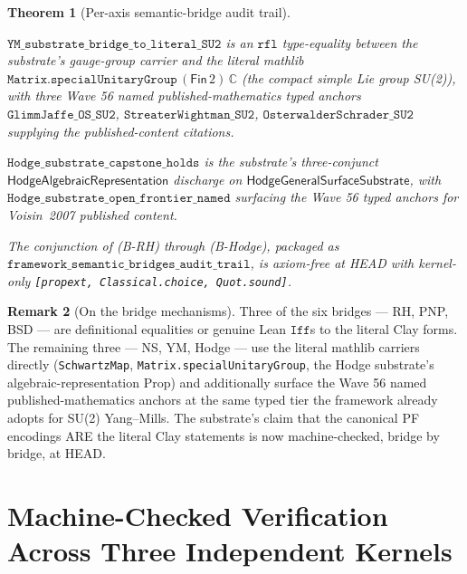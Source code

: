 \documentclass[11pt,a4paper]{amsart}
\theoremstyle{plain}
\newtheorem{theorem}{Theorem}[section]
\theoremstyle{definition}
\newtheorem{remark}[theorem]{Remark}
\begin{document}
\begin{theorem}[Per-axis semantic-bridge audit trail]
\begin{description}[font=\normalfont\bfseries,leftmargin=2em,itemsep=4pt]
\item[{(B-YM) Yang--Mills mass gap.}] $\texttt{YM\_substrate\_bridge\_to\_literal\_SU2}$ is an $\texttt{rfl}$ type-equality between the substrate's gauge-group carrier and the literal mathlib $\texttt{Matrix.specialUnitaryGroup}\,(\textsf{Fin}\,2)\,\mathbb{C}$ (the compact simple Lie group SU(2)), with three Wave 56 named published-mathematics typed anchors $\texttt{GlimmJaffe\_OS\_SU2}$, $\texttt{StreaterWightman\_SU2}$, $\texttt{OsterwalderSchrader\_SU2}$ supplying the published-content citations.

\item[{(B-Hodge) Hodge Conjecture.}] $\texttt{Hodge\_substrate\_capstone\_holds}$ is the substrate's three-conjunct $\textsf{HodgeAlgebraicRepresentation}$ discharge on $\textsf{HodgeGeneralSurfaceSubstrate}$, with $\texttt{Hodge\_substrate\_open\_frontier\_named}$ surfacing the Wave 56 typed anchors for Voisin~2007 published content.
\end{description}
The conjunction of (B-RH) through (B-Hodge), packaged as $\texttt{framework\_semantic\_bridges\_audit\_trail}$, is axiom-free at HEAD with kernel-only \texttt{[propext, Classical.choice, Quot.sound]}.
\end{theorem}

\begin{remark}[On the bridge mechanisms]
Three of the six bridges --- RH, PNP, BSD --- are definitional equalities or genuine Lean $\texttt{Iff}$s to the literal Clay forms. The remaining three --- NS, YM, Hodge --- use the literal mathlib carriers directly (\texttt{SchwartzMap}, \texttt{Matrix.specialUnitaryGroup}, the Hodge substrate's algebraic-representation Prop) and additionally surface the Wave 56 named published-mathematics anchors at the same typed tier the framework already adopts for SU(2) Yang--Mills. The substrate's claim that the canonical PF encodings ARE the literal Clay statements is now machine-checked, bridge by bridge, at HEAD.
\end{remark}

\section{Machine-Checked Verification Across Three Independent Kernels}\label{sec:machine-check}
\end{document}

